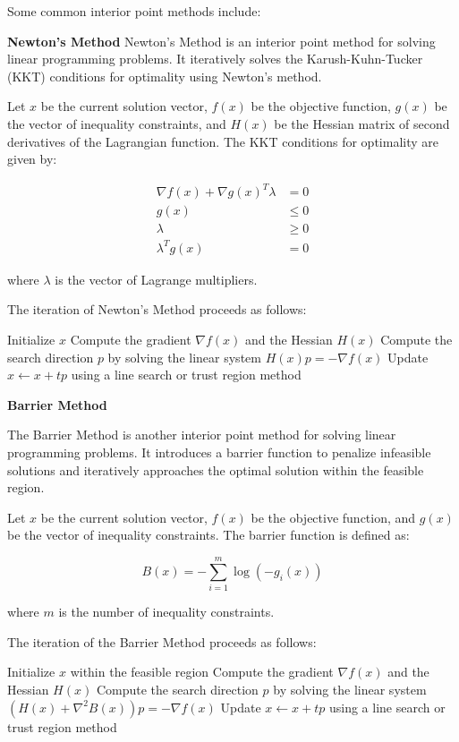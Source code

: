 \documentclass[12pt]{book} %
\begin{document}
Some common interior point methods include:

\textbf{Newton's Method}
\FloatBarrier
Newton's Method is an interior point method for solving linear programming problems. It iteratively solves the Karush-Kuhn-Tucker (KKT) conditions for optimality using Newton's method.

Let \(x\) be the current solution vector, \(f(x)\) be the objective function, \(g(x)\) be the vector of inequality constraints, and \(H(x)\) be the Hessian matrix of second derivatives of the Lagrangian function. The KKT conditions for optimality are given by:

\[
\begin{aligned}
    \nabla f(x) + \nabla g(x)^T \lambda &= 0 \\
    g(x) &\leq 0 \\
    \lambda &\geq 0 \\
    \lambda^T g(x) &= 0
\end{aligned}
\]

where \(\lambda\) is the vector of Lagrange multipliers.

The iteration of Newton's Method proceeds as follows:
\FloatBarrier
\begin{algorithm}[H]
\caption{Newton's Method}
\begin{algorithmic}[1]
\State Initialize \(x\)
\State Compute the gradient \(\nabla f(x)\) and the Hessian \(H(x)\)
\State Compute the search direction \(p\) by solving the linear system \(H(x) p = -\nabla f(x)\)
\State Update \(x \leftarrow x + t p\) using a line search or trust region method
\EndWhile
\end{algorithmic}
\end{algorithm}
\FloatBarrier

\textbf{Barrier Method}

The Barrier Method is another interior point method for solving linear programming problems. It introduces a barrier function to penalize infeasible solutions and iteratively approaches the optimal solution within the feasible region.

Let \(x\) be the current solution vector, \(f(x)\) be the objective function, and \(g(x)\) be the vector of inequality constraints. The barrier function is defined as:

\[
B(x) = -\sum_{i=1}^{m} \log(-g_i(x))
\]

where \(m\) is the number of inequality constraints.

The iteration of the Barrier Method proceeds as follows:
\FloatBarrier
\begin{algorithm}[H]
\caption{Barrier Method}
\begin{algorithmic}[1]
\State Initialize \(x\) within the feasible region
\State Compute the gradient \(\nabla f(x)\) and the Hessian \(H(x)\)
\State Compute the search direction \(p\) by solving the linear system \((H(x) + \nabla^2 B(x)) p = -\nabla f(x)\)
\State Update \(x \leftarrow x + t p\) using a line search or trust region method
\EndWhile
\end{algorithmic}
\end{algorithm}
\FloatBarrier
\end{document}
